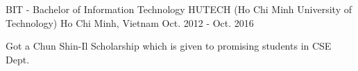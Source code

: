 

\begin{cventries}

  \cventry
    {BIT - Bachelor of Information Technology} %
    {HUTECH (Ho Chi Minh University of Technology)} %
    {Ho Chi Minh, Vietnam} %
    {Oct. 2012 - Oct. 2016} %
    {
      \begin{cvitems} %
        \item {Got a Chun Shin-Il Scholarship which is given to promising students in CSE Dept.}
      \end{cvitems}
    }

\end{cventries}
